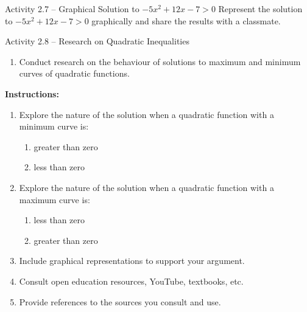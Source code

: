 \begin{activity}{Activity 2.7 -- Graphical Solution to $-5x^2 + 12x - 7 > 0$}
Represent the solution to $-5x^2 + 12x - 7 > 0$ graphically and share the results
with a classmate.
\end{activity}

\begin{activity}{Activity 2.8 -- Research on Quadratic Inequalities}
\begin{enumerate}
  \item Conduct research on the behaviour of solutions to maximum and
  minimum curves of quadratic functions.
\end{enumerate}
\textbf{Instructions:}
\begin{enumerate}
  \item[a.] Explore the nature of the solution when a quadratic function with a
  minimum curve is:
  \begin{enumerate}
    \item[i.] greater than zero
    \item[ii.] less than zero
  \end{enumerate}
  \item[b.] Explore the nature of the solution when a quadratic function with a
  maximum curve is:
  \begin{enumerate}
    \item[i.] less than zero
    \item[ii.] greater than zero
  \end{enumerate}
  \item[c.] Include graphical representations to support your argument.
  \item[d.] Consult open education resources, YouTube, textbooks, etc.
  \item[e.] Provide references to the sources you consult and use.
\end{enumerate}
\end{activity}
